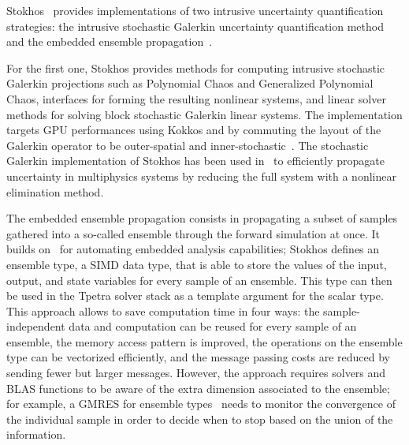 Stokhos~\cite{phipps2015stokhos,Phipps2016,phipps2014exploring} provides implementations of two intrusive uncertainty quantification strategies: 
the intrusive stochastic Galerkin uncertainty quantification method~\cite{ghanem1990polynomial,ghanem2003stochastic} and the embedded ensemble propagation~\cite{phipps2017embedded}.

For the first one, Stokhos provides methods for computing intrusive stochastic Galerkin projections such as Polynomial Chaos and Generalized Polynomial Chaos, 
interfaces for forming the resulting nonlinear systems, and linear solver methods for solving block stochastic Galerkin linear systems.
The implementation targets GPU performances using Kokkos and by commuting the layout of the Galerkin operator to be outer-spatial and inner-stochastic~\cite{phipps2014exploring}.
The stochastic Galerkin implementation of Stokhos has been used in~\cite{constantine2014efficient} to efficiently propagate uncertainty in multiphysics systems by reducing the full system with a nonlinear elimination method.

The embedded ensemble propagation consists in propagating a subset of samples gathered into a so-called ensemble through the forward simulation at once.
It builds on~\cite{pawlowski2012automating} for automating embedded analysis capabilities; Stokhos defines an ensemble type, a SIMD data type, that is able to store
the values of the input, output, and state variables for every sample of an ensemble. This type can then be used in the Tpetra solver stack as a template argument for the scalar type.
This approach allows to save computation time in four ways: the sample-independent data and computation can be reused for every sample of an ensemble, the memory access pattern is improved,
the operations on the ensemble type can be vectorized efficiently, and the message passing costs are reduced by sending fewer but larger messages.
However, the approach requires solvers and BLAS functions to be aware of the extra dimension associated to the ensemble; for example, a GMRES for ensemble types~\cite{liegeois2020gmres} needs to monitor 
the convergence of the individual sample in order to decide when to stop based on the union of the information.
